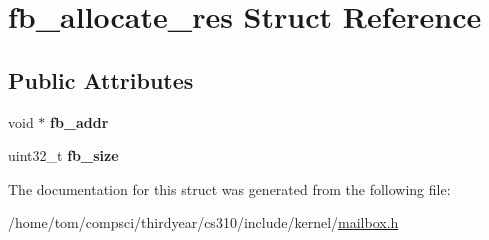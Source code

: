 \hypertarget{structfb__allocate__res}{}\section{fb\+\_\+allocate\+\_\+res Struct Reference}
\label{structfb__allocate__res}
\subsection*{Public Attributes}
\begin{DoxyCompactItemize}
\item 
\mbox{\label{structfb__allocate__res_a19eca56774c30734277b97b0b39e283c}} 
void $\ast$ {\bfseries fb\+\_\+addr}
\item 
\mbox{\label{structfb__allocate__res_a26073f15c8391969ed99e346bab1bd3f}} 
uint32\+\_\+t {\bfseries fb\+\_\+size}
\end{DoxyCompactItemize}


The documentation for this struct was generated from the following file\+:\begin{DoxyCompactItemize}
\item 
/home/tom/compsci/thirdyear/cs310/include/kernel/\mbox{\hyperlink{mailbox_8h}{mailbox.\+h}}\end{DoxyCompactItemize}

